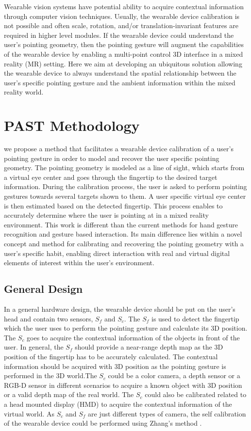 Wearable vision systems have potential ability to acquire contextual information through computer vision techniques\cite{Kurata2000}. Usually, the wearable device calibration is not possible and often scale, rotation, and/or translation-invariant features are required in higher level modules. If the wearable device could understand the user{\rq}s pointing geometry, then the pointing gesture will augment the capabilities of the wearable device by enabling a multi-point control 3D interface in a mixed reality (MR) setting. Here we aim at developing  an ubiquitous solution allowing the wearable device to always understand the spatial relationship between the user{\rq}s specific pointing gesture and the ambient information within the mixed reality world.

\section{PAST Methodology}
\label{sec:3-PAST:Methodology}
we propose a method that facilitates a wearable device calibration of a user's pointing gesture in order to model and recover the user specific pointing geometry. The pointing geometry is modeled as a line of sight, which starts from a virtual eye center and goes through the fingertip to the desired target information. During the calibration process, the user is asked to perform pointing gestures towards several targets shown to them. A user specific virtual eye center is then estimated based on the detected fingertip.
This process enables to accurately determine where the user is pointing at in a mixed reality environment. This work is different than the current methods for hand gesture recognition and gesture based interaction.  Its main difference lies within a novel concept and method for calibrating and recovering the pointing geometry with a user's specific habit, enabling direct interaction with real and virtual digital elements of interest within the user's environment.

\subsection{General Design}
\label{sec:3-PAST:GD}
In a general hardware design, the wearable device should be put on the user's head and contain two sensors, $S_{f}$ and $S_{c}$. The  $S_f$ is used to detect the fingertip which the user uses to perform the pointing gesture and calculate its 3D position. The $S_c$ goes to acquire the contextual information of the objects in front of the user. In general, the  $S_f$ should provide a near-range depth map as the 3D position of the fingertip has to be accurately calculated. The contextual information should be acquired with 3D position as the pointing gesture is performed in the 3D world.The $S_c$ could be a color camera, a depth sensor or a RGB-D sensor in different scenarios to acquire a known object with 3D position or a valid depth map of the real world. The $S_c$ could also be calibrated related to a head mounted display (HMD) to acquire the contextual information of the virtual world. As $S_c$ and  $S_f$ are just different types of camera, the self calibration of the wearable device could be performed using Zhang{\rq}s method \cite{Zhang2000}.

